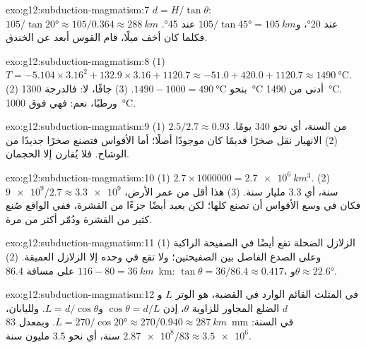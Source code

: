 \begin{solution}{exo:g12:subduction-magmatism:7}
$d = H/\tan\theta$: $105/\tan\ang{20} \approx 105/0.364 \approx
\qty{288}{km}$ عند \ang{20}، و$105/\tan\ang{45} = \qty{105}{km}$ عند
\ang{45}. فكلما كان  أخف ميلًا، قام القوس أبعد عن الخندق.
\end{solution}

\begin{solution}{exo:g12:subduction-magmatism:8}
(1) $T = -5.104 \times 3.16^2 + 132.9 \times 3.16 + 1120.7 \approx -51.0 +
420.0 + 1120.7 \approx \qty{1490}{\celsius}$. (2) بنحو $1490 - 1000 =
\qty{490}{\celsius}$. (3) جافًا، لا: فالدرجة \qty{1300}{\celsius} أدنى من
\qty{1490}{\celsius}. ورطبًا، نعم: فهي فوق \qty{1000}{\celsius}.
\end{solution}

\begin{solution}{exo:g12:subduction-magmatism:9}
(1) $2.5/2.7 \approx 0.93$ من السنة، أي نحو 340 يومًا. (2) الانهيار نقل
صخرًا قديمًا كان موجودًا أصلًا؛ أما الأقواس فتصنع صخرًا جديدًا من الوشاح. فلا
يُقارن إلا الحجمان.
\end{solution}

\begin{solution}{exo:g12:subduction-magmatism:10}
(1) $2.7 \times \num{1000000} = \qty{2.7e6}{km^3}$. (2) $\num{9e9}/2.7
\approx \num{3.3e9}$ سنة، أي 3.3 مليار سنة. (3) هذا أقل من عمر
الأرض، فكان في وسع الأقواس أن تصنع  كلها؛ لكن
 يعيد أيضًا جزءًا من القشرة، ففي الواقع صُنع كثير من القشرة
ودُمّر أكثر من مرة.
\end{solution}

\begin{solution}{exo:g12:subduction-magmatism:11}
(1) الزلازل الضحلة تقع أيضًا في الصفيحة الراكبة وعلى الصدع
الفاصل بين الصفيحتين؛ ولا تقع في  وحده إلا الزلازل العميقة.
(2) $116 - 80 = \qty{36}{km}$ على مسافة \qty{86.4}{km}: $\tan\theta = 36/86.4
\approx 0.417$، و$\theta \approx \ang{22.6}$.
\end{solution}

\begin{solution}{exo:g12:subduction-magmatism:12}
في المثلث القائم الوارد في القضية،  هو الوتر $L$
و$d$ الضلع المجاور للزاوية $\theta$، إذن $\cos\theta = d/L$ و$L =
d/\cos\theta$. ولليابان، $L = 270/\cos\ang{20} \approx 270/0.940 \approx
\qty{287}{km}$. وبمعدل \qty{83}{mm} في السنة: $\num{2.87e8}/83 \approx \num{3.5e6}$
سنة، أي نحو 3.5 مليون سنة.
\end{solution}

